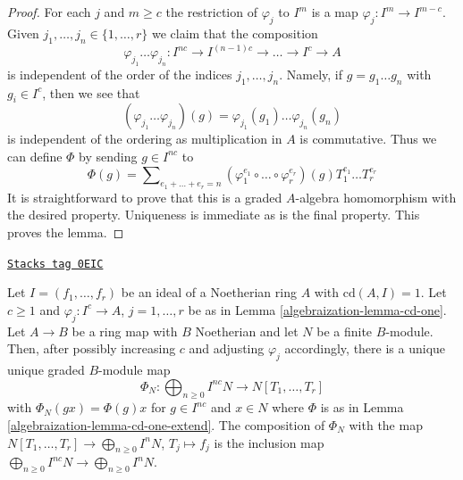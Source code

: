 \begin{proof}
For each $j$ and $m \geq c$ the restriction of $\varphi_j$ to
$I^m$ is a map $\varphi_j : I^m \to I^{m - c}$.
Given $j_1, \ldots, j_n \in \{1, \ldots, r\}$ we claim that the
composition
$$
\varphi_{j_1} \ldots \varphi_{j_n} :
I^{nc} \to I^{(n - 1)c} \to \ldots \to I^c \to A
$$
is independent of the order of the indices $j_1, \ldots, j_n$.
Namely, if $g = g_1 \ldots g_n$ with $g_i \in I^c$, then
we see that
$$
(\varphi_{j_1} \ldots \varphi_{j_n})(g) =
\varphi_{j_1}(g_1) \ldots \varphi_{j_n}(g_n)
$$
is independent of the ordering as multiplication in $A$ is commutative.
Thus we can define $\Phi$ by sending $g \in I^{nc}$ to
$$
\Phi(g) = \sum\nolimits_{e_1 + \ldots + e_r = n}
(\varphi_1^{e_1} \circ \ldots \circ \varphi_r^{e_r})(g)
T_1^{e_1} \ldots T_r^{e_r}
$$
It is straightforward to prove that this is a graded $A$-algebra
homomorphism with the desired property. Uniqueness is immediate
as is the final property. This proves the lemma.
\end{proof}

\begin{lemma}
\label{algebraization-lemma-cd-one-extend-to-module}
\href{https://stacks.math.columbia.edu/tag/0EIC}{\texttt{Stacks tag 0EIC}}

Let $I = (f_1, \ldots, f_r)$ be an ideal of a Noetherian ring $A$
with $\text{cd}(A, I) = 1$. Let $c \geq 1$ and $\varphi_j : I^c \to A$,
$j = 1, \ldots, r$ be as in Lemma \ref{algebraization-lemma-cd-one}.
Let $A \to B$ be a ring map with $B$ Noetherian and let $N$ be
a finite $B$-module. Then, after possibly increasing $c$
and adjusting $\varphi_j$ accordingly, there is a unique
unique graded $B$-module map
$$
\Phi_N : \bigoplus\nolimits_{n \geq 0} I^{nc}N \to N[T_1, \ldots, T_r]
$$
with $\Phi_N(g x) = \Phi(g) x$ for $g \in I^{nc}$ and $x \in N$
where $\Phi$ is as in Lemma \ref{algebraization-lemma-cd-one-extend}.
The composition of $\Phi_N$ with the map
$N[T_1, \ldots, T_r] \to \bigoplus_{n \geq 0} I^nN$,
$T_j \mapsto f_j$ is the inclusion map
$\bigoplus_{n \geq 0} I^{nc}N \to \bigoplus_{n \geq 0} I^nN$.
\end{lemma}


